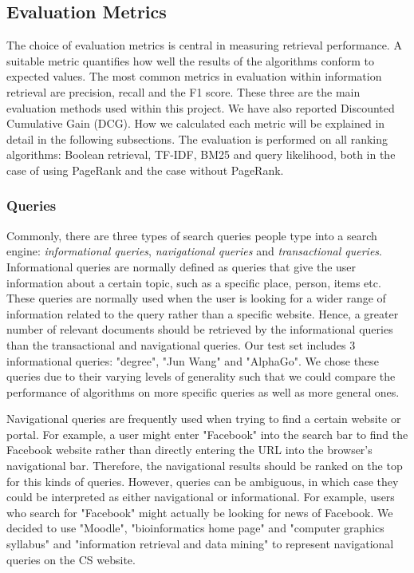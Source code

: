 

\subsection{Evaluation Metrics} %
\label{sub:metrics_&_analysis}

The choice of evaluation metrics is central in measuring retrieval performance. A suitable metric quantifies how well the results of the algorithms conform to expected values. The most common metrics in evaluation within information retrieval are precision, recall and the F1 score. These three are the main evaluation methods used within this project. We have also reported Discounted Cumulative Gain (DCG). How we calculated each metric will be explained in detail in the following subsections. The evaluation is performed on all ranking algorithms: Boolean retrieval, TF-IDF, BM25 and query likelihood, both in the case of using PageRank and the case without PageRank.

\subsubsection{Queries}
\label{ssub:evaluation_queries}
Commonly, there are three types of search queries people type into a search engine: \emph{informational queries}, \emph{navigational queries} and \emph{transactional queries}.
Informational queries are normally defined as queries that give the user information about a certain topic, such as a specific place, person, items etc. These queries are normally used when the user is looking for a wider range of information related to the query rather than a specific website. Hence, a greater number of relevant documents should be retrieved by the informational queries than the transactional and navigational queries. Our test set includes 3 informational queries: "degree", "Jun Wang" and "AlphaGo". We chose these queries due to their varying levels of generality such that we could compare the performance of algorithms on more specific queries as well as more general ones.

Navigational queries are frequently used when trying to find a certain website or portal. For example, a user might enter "Facebook" into the search bar to find the Facebook website rather than directly entering the URL into the browser's navigational bar. Therefore, the navigational results should be ranked on the top for this kinds of queries. However, queries can be ambiguous, in which case they could be interpreted as either navigational or informational. For example, users who search for "Facebook" might actually be looking for news of Facebook. We decided to use "Moodle", "bioinformatics home page" and "computer graphics syllabus" and "information retrieval and data mining" to represent navigational queries on the CS website.

